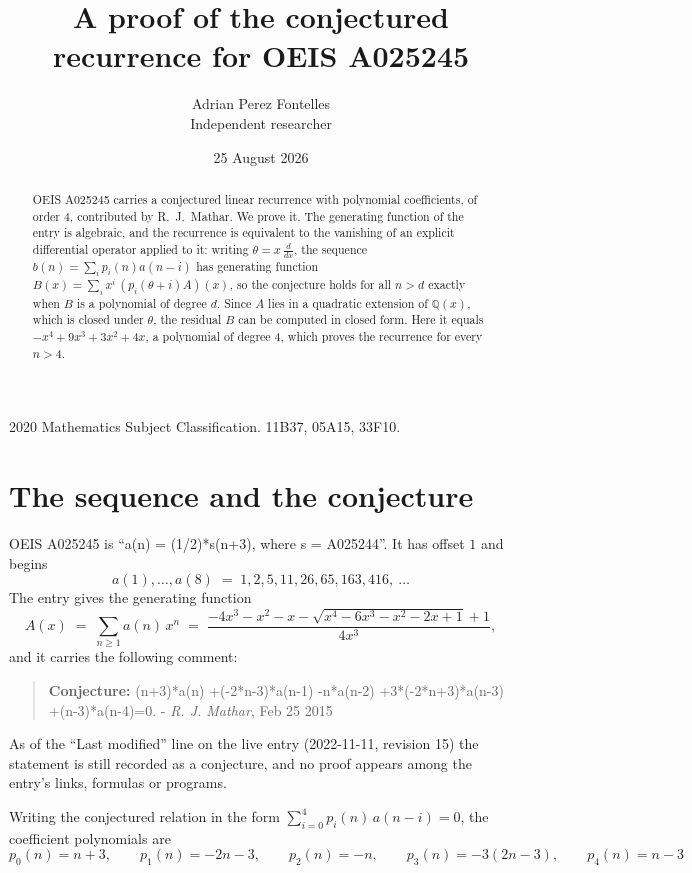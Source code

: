 \documentclass[11pt,a4paper]{article}
\title{A proof of the conjectured recurrence for OEIS A025245}
\author{Adrian Perez Fontelles\\ \small Independent researcher}
\date{25 August 2026}
\theoremstyle{plain}
\theoremstyle{definition}
\begin{document}
\maketitle

\begin{abstract}
OEIS A025245 carries a conjectured linear recurrence with polynomial coefficients, of
order 4, contributed by R.~J.~Mathar. We prove it. The generating function of the
entry is algebraic, and the recurrence is equivalent to the vanishing of an explicit
differential operator applied to it: writing $\theta=x\,\frac{d}{dx}$, the sequence
$b(n)=\sum_{i}p_{i}(n)a(n-i)$ has generating function
$B(x)=\sum_{i}x^{i}\,(p_{i}(\theta+i)A)(x)$, so the conjecture holds for all $n>d$ exactly
when $B$ is a polynomial of degree $d$. Since $A$ lies in a quadratic extension of
$\mathbb{Q}(x)$, which is closed under $\theta$, the residual $B$ can be computed in
closed form. Here it equals $- x^{4} + 9 x^{3} + 3 x^{2} + 4 x$, a polynomial of degree $4$, which proves
the recurrence for every $n>4$.
\end{abstract}

\noindent\small 2020 Mathematics Subject Classification. 11B37, 05A15, 33F10.\normalsize

\section{The sequence and the conjecture}

OEIS A025245 is ``a(n) = (1/2)*s(n+3), where s = A025244''. It has offset $1$ and begins
\[
a(1),\dots,a(8)\;=\;1, 2, 5, 11, 26, 65, 163, 416,\ \dots
\]
The entry gives the generating function
\begin{equation}\label{eq:gf}
A(x)\;=\;\sum_{n\ge 1} a(n)\,x^{n}\;=\;\frac{- 4 x^{3} - x^{2} - x - \sqrt{x^{4} - 6 x^{3} - x^{2} - 2 x + 1} + 1}{4 x^{3}} ,
\end{equation}
and it carries the following comment:
\begin{quote}\small
\textbf{Conjecture:} (n+3)*a(n) +(-2*n-3)*a(n-1) -n*a(n-2) +3*(-2*n+3)*a(n-3) +(n-3)*a(n-4)=0. - \emph{R. J. Mathar}, Feb 25 2015
\end{quote}
As of the ``Last modified'' line on the live entry (2022-11-11, revision 15) the
statement is still recorded as a conjecture, and no proof appears among the entry's links,
formulas or programs.

Writing the conjectured relation in the form $\sum_{i=0}^{4}p_{i}(n)\,a(n-i)=0$,
the coefficient polynomials are
\[
p_{0}(n)=n + 3,\qquad p_{1}(n)=- 2 n - 3,\qquad p_{2}(n)=- n,\qquad p_{3}(n)=- 3 \left(2 n - 3\right),\qquad p_{4}(n)=n - 3
\]
\end{document}
